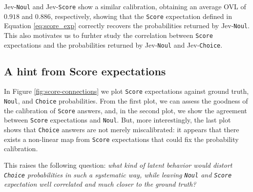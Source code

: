 \documentclass[twoside]{article}
\begin{document}
Jev-\texttt{Noul} and Jev-\texttt{Score} show a similar calibration, obtaining an average OVL of $0.918$ and $0.886$, respectively, showing that the \texttt{Score} expectation defined in Equation \ref{eq:score_exp} correctly recovers the probabilities returned by Jev-\texttt{Noul}.
This also motivates us to furhter study the correlation between \texttt{Score} expectations and the probabilities returned by Jev-\texttt{Noul} and Jev-\texttt{Choice}.

\subsection{A hint from Score expectations}
In Figure \ref{fig:score-connections} we plot \texttt{Score} expectations against ground truth, \texttt{Noul}, and \texttt{Choice} probabilities. From the first plot, we can assess the goodness of the calibration of \texttt{Score} answers, and, in the second plot, we show the agreement between \texttt{Score} expectations and \texttt{Noul}.
But, more interestingly, the last plot shows that \texttt{Choice} answers are not merely miscalibrated: it appears that there exists a non-linear map from \texttt{Score} expectations that could fix the probability calibration.

This raises the following question: \textit{what kind of latent behavior would distort \texttt{Choice} probabilities in such a systematic way, while leaving \texttt{Noul} and \texttt{Score} expectation well correlated and much closer to the ground truth?}




\end{document}

